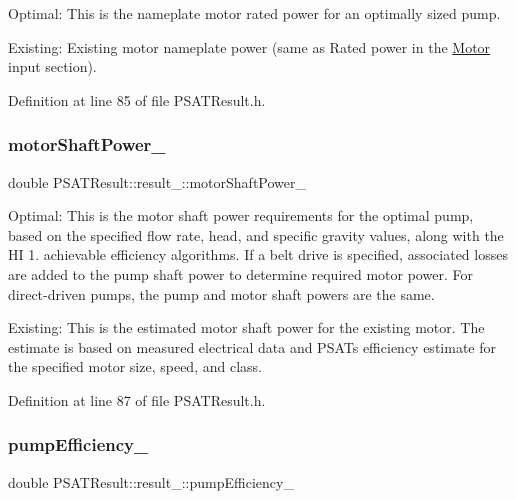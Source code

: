 Optimal\+: This is the nameplate motor rated power for an optimally sized pump. 

Existing\+: Existing motor nameplate power (same as Rated power in the \hyperlink{class_motor}{Motor} input section). 

Definition at line 85 of file P\+S\+A\+T\+Result.\+h.

\mbox{\label{struct_p_s_a_t_result_1_1result___a323a0097e50cc796e105803f435f3f88}} 
\subsubsection{\texorpdfstring{motor\+Shaft\+Power\+\_\+}{motorShaftPower\_}}
{\footnotesize\ttfamily double P\+S\+A\+T\+Result\+::result\+\_\+\+::motor\+Shaft\+Power\+\_\+}



Optimal\+: This is the motor shaft power requirements for the optimal pump, based on the specified flow rate, head, and specific gravity values, along with the HI 1. achievable efficiency algorithms. If a belt drive is specified, associated losses are added to the pump shaft power to determine required motor power. For direct-\/driven pumps, the pump and motor shaft powers are the same. 

Existing\+: This is the estimated motor shaft power for the existing motor. The estimate is based on measured electrical data and P\+S\+AT\textquotesingle{}s efficiency estimate for the specified motor size, speed, and class. 

Definition at line 87 of file P\+S\+A\+T\+Result.\+h.

\mbox{\label{struct_p_s_a_t_result_1_1result___a0065022cdb7678fd08ac63d80de08f85}} 
\subsubsection{\texorpdfstring{pump\+Efficiency\+\_\+}{pumpEfficiency\_}}
{\footnotesize\ttfamily double P\+S\+A\+T\+Result\+::result\+\_\+\+::pump\+Efficiency\+\_\+}



